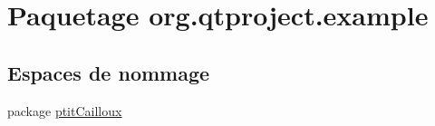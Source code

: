 \hypertarget{namespaceorg_1_1qtproject_1_1example}{\section{Paquetage org.\-qtproject.\-example}
\label{namespaceorg_1_1qtproject_1_1example}
}
\subsection*{Espaces de nommage}
\begin{DoxyCompactItemize}
\item 
package \hyperlink{namespaceorg_1_1qtproject_1_1example_1_1ptit_cailloux}{ptit\-Cailloux}
\end{DoxyCompactItemize}
